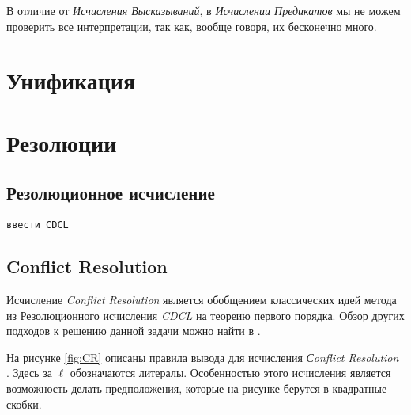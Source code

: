 В отличие от \textit{Исчисления Высказываний}, в \textit{Исчислении Предикатов} мы не можем проверить все интерпретации, так как, вообще говоря, их бесконечно много.\\

\section{Унификация}

\section{Резолюции}

\subsection{Резолюционное исчисление}
\texttt{ввести CDCL}

\subsection{Conflict Resolution}
\label{sec:CR}
Исчисление \emph{Conflict Resolution} является обобщением классических идей метода из Резолюционного исчисления \emph{CDCL} на теореию первого порядка. Обзор других подходов к решению данной задачи можно найти в \cite{DBLP:journals/corr/SlaneyP16}. 

На рисунке \ref{fig:CR} описаны правила вывода для исчисления \emph{Сonflict Resolution} \cite{DBLP:journals/corr/SlaneyP16}. Здесь за $\ell$ обозначаются литералы. Особенностью этого исчисления является возможность делать предположения, которые на рисунке берутся в квадратные скобки.

